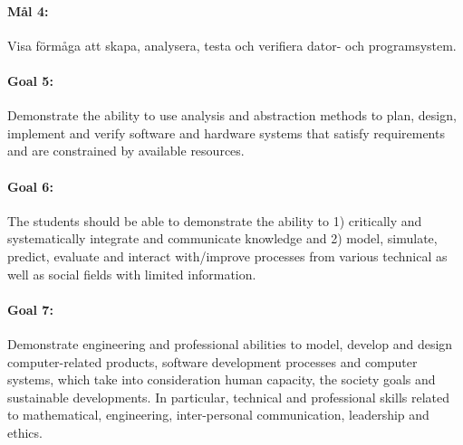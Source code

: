 \paragraph{Mål 4:} Visa förmåga att skapa, analysera, testa och
verifiera dator- och programsystem.


\paragraph{Goal 5:} Demonstrate the ability to use analysis and
abstraction methods to plan, design, implement and verify software and
hardware systems that satisfy requirements and are constrained by
available resources.

\paragraph{Goal 6:} The students should be able to demonstrate the
ability to 1) critically and systematically integrate and communicate
knowledge and 2) model, simulate, predict, evaluate and interact
with/improve processes from various technical as well as social fields
with limited information.

% 

\paragraph{Goal 7:} Demonstrate engineering and professional abilities
to model, develop and design computer-related products, software
development processes and computer systems, which take into
consideration human capacity, the society goals and sustainable
developments. In particular, technical and professional skills related
to mathematical, engineering, inter-personal communication, leadership
and ethics.


